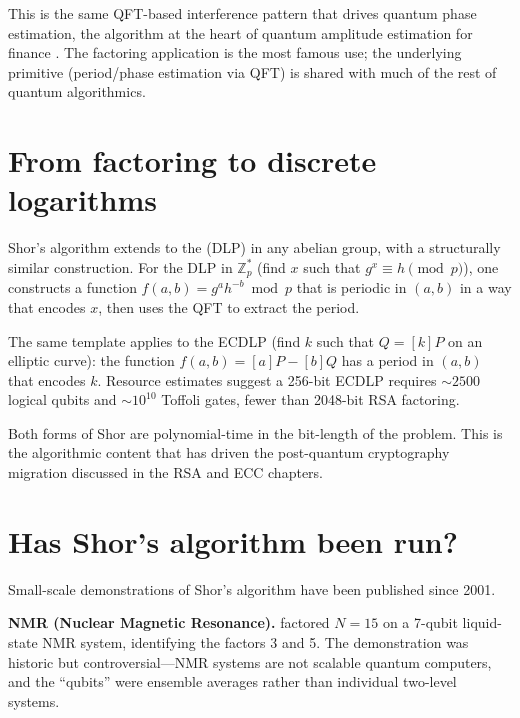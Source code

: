 This is the same QFT-based interference pattern that drives quantum phase estimation, the algorithm at the heart of quantum amplitude estimation for finance \citep{stamatopoulos_option_2020}. The factoring application is the most famous use; the underlying primitive (period/phase estimation via QFT) is shared with much of the rest of quantum algorithmics.

\section{From factoring to discrete logarithms}

Shor's algorithm extends to the  (DLP) in any abelian group, with a structurally similar construction. For the DLP in $\mathbb{Z}_p^*$ (find $x$ such that $g^x \equiv h \pmod{p}$), one constructs a function $f(a,b) = g^a h^{-b} \bmod p$ that is periodic in $(a,b)$ in a way that encodes $x$, then uses the QFT to extract the period.

The same template applies to the ECDLP (find $k$ such that $Q = [k]P$ on an elliptic curve): the function $f(a,b) = [a]P - [b]Q$ has a period in $(a,b)$ that encodes $k$. Resource estimates suggest a 256-bit ECDLP requires $\sim 2500$ logical qubits and $\sim 10^{10}$ Toffoli gates, fewer than 2048-bit RSA factoring.

Both forms of Shor are polynomial-time in the bit-length of the problem. This is the algorithmic content that has driven the post-quantum cryptography migration discussed in the RSA and ECC chapters.

\section{Has Shor's algorithm been run?}

Small-scale demonstrations of Shor's algorithm have been published since 2001.

\textbf{NMR (Nuclear Magnetic Resonance).} \citet{vandersypen_experimental_2001} factored $N=15$ on a 7-qubit liquid-state NMR system, identifying the factors 3 and 5. The demonstration was historic but controversial---NMR systems are not scalable quantum computers, and the ``qubits'' were ensemble averages rather than individual two-level systems.

